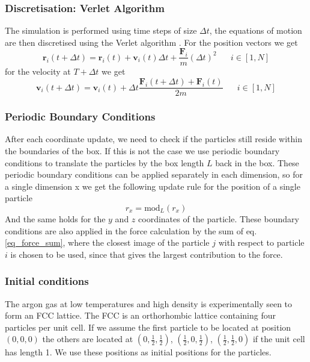 \documentclass[twoside]{article}
\begin{document}
	\subsubsection*{Discretisation: Verlet Algorithm}
	
	The simulation is performed using time steps of size $\Delta t$, the equations of motion are then discretised using the Verlet algorithm \cite{ref_verlet}. For the position vectors we get
	\begin{equation}\label{eq_verlet_pos}
	\mathbf{r}_i(t+\Delta t) = \mathbf{r}_i(t) + \mathbf{v}_i(t)\Delta t + \frac{\mathbf{F}_i}{m}(\Delta t) ^2  \hspace{20pt} i\in [1, N]
	\end{equation}
	for the velocity at $T+\Delta t$ we get
	\begin{equation}\label{eq_verlet_vel}
	\mathbf{v}_i(t+\Delta t) = \mathbf{v}_i(t) + \Delta t \frac{\mathbf{F}_i(t + \Delta t) + \mathbf{F}_i(t)}{2m}  \hspace{20pt} i\in [1, N]
	\end{equation}
	
	\subsubsection*{Periodic Boundary Conditions}
	After each coordinate update, we need to check if the particles still reside within the boundaries of the box. If this is not the case we use periodic boundary conditions to translate the particles by the box length $L$ back in the box. These periodic boundary conditions can be applied separately in each dimension, so for a single dimension x we get the following update rule for the position of a single particle
	\begin{equation}\label{eq_pbc}
	r_x = \text{mod}_L(r_x)
	\end{equation}
	And the same holds for the $y$ and $z$ coordinates of the particle. These boundary conditions are also applied in the force calculation by the sum of eq.\ref{eq_force_sum}, where the closest image of the particle $j$ with respect to particle $i$ is chosen to be used, since that gives the largest contribution to the force. 
	
	
	\subsubsection*{Initial conditions}
	The argon gas at low temperatures and high density is experimentally seen to form an FCC lattice. The FCC is an orthorhombic lattice containing four particles per unit cell. If we assume the first particle to be located at position $(0,0,0)$ the others are located at $(0,\frac{1}{2},\frac{1}{2})$, $(\frac{1}{2},0,\frac{1}{2})$, $(\frac{1}{2},\frac{1}{2},0)$ if the unit cell has length 1. We use these positions as initial positions for the particles.
	
\end{document}
